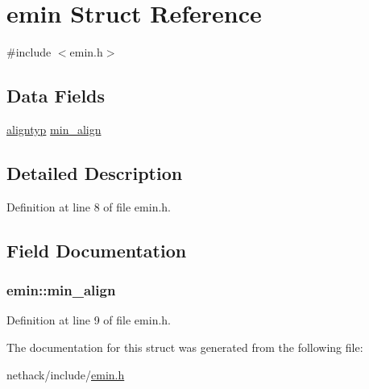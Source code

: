 \hypertarget{structemin}{\section{emin Struct Reference}
\label{structemin}
}


{\ttfamily \#include $<$emin.\+h$>$}

\subsection*{Data Fields}
\begin{DoxyCompactItemize}
\item 
\hyperlink{align_8h_a3e17b7a656899892e425fc89481aa2ab}{aligntyp} \hyperlink{structemin_a28d933e83359a8f8d2ae83200607db89}{min\+\_\+align}
\end{DoxyCompactItemize}


\subsection{Detailed Description}


Definition at line 8 of file emin.\+h.



\subsection{Field Documentation}
\hypertarget{structemin_a28d933e83359a8f8d2ae83200607db89}{
\subsubsection[{min\+\_\+align}]{ emin\+::min\+\_\+align}}\label{structemin_a28d933e83359a8f8d2ae83200607db89}


Definition at line 9 of file emin.\+h.



The documentation for this struct was generated from the following file\+:\begin{DoxyCompactItemize}
\item 
nethack/include/\hyperlink{emin_8h}{emin.\+h}\end{DoxyCompactItemize}
